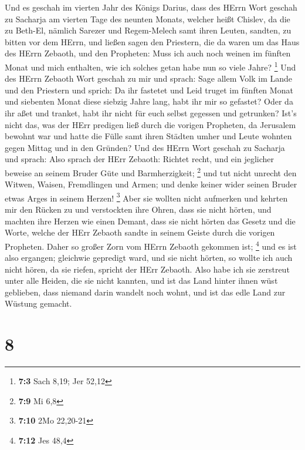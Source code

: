  Und es geschah im vierten Jahr des Königs Darius, dass
des HErrn Wort geschah zu Sacharja am vierten Tage des neunten Monats,
welcher heißt Chislev,  da die zu Beth-El, nämlich Sarezer
und Regem-Melech samt ihren Leuten, sandten, zu bitten vor dem HErrn,
 und ließen sagen den Priestern, die da waren um das Haus
des HErrn Zebaoth, und den Propheten: Muss ich auch noch weinen im
fünften Monat und mich enthalten, wie ich solches getan habe nun so
viele Jahre? \footnote{\textbf{7:3} Sach 8,19; Jer 52,12} 
Und des HErrn Zebaoth Wort geschah zu mir und sprach: 
Sage allem Volk im Lande und den Priestern und sprich: Da ihr fastetet
und Leid truget im fünften Monat und siebenten Monat diese siebzig Jahre
lang, habt ihr mir so gefastet?  Oder da ihr aßet und
tranket, habt ihr nicht für euch selbst gegessen und getrunken?
 Ist's nicht das, was der HErr predigen ließ durch die
vorigen Propheten, da Jerusalem bewohnt war und hatte die Fülle samt
ihren Städten umher und Leute wohnten gegen Mittag und in den Gründen?
 Und des HErrn Wort geschah zu Sacharja und sprach:
 Also sprach der HErr Zebaoth: Richtet recht, und ein
jeglicher beweise an seinem Bruder Güte und Barmherzigkeit; \footnote{\textbf{7:9}
  Mi 6,8}  und tut nicht unrecht den Witwen, Waisen,
Fremdlingen und Armen; und denke keiner wider seinen Bruder etwas Arges
in seinem Herzen! \footnote{\textbf{7:10} 2Mo 22,20-21} 
Aber sie wollten nicht aufmerken und kehrten mir den Rücken zu und
verstockten ihre Ohren, dass sie nicht hörten,  und
machten ihre Herzen wie einen Demant, dass sie nicht hörten das Gesetz
und die Worte, welche der HErr Zebaoth sandte in seinem Geiste durch die
vorigen Propheten. Daher so großer Zorn vom HErrn Zebaoth gekommen ist;
\footnote{\textbf{7:12} Jes 48,4}  und es ist also
ergangen; gleichwie gepredigt ward, und sie nicht hörten, so wollte ich
auch nicht hören, da sie riefen, spricht der HErr Zebaoth.
 Also habe ich sie zerstreut unter alle Heiden, die sie
nicht kannten, und ist das Land hinter ihnen wüst geblieben, dass
niemand darin wandelt noch wohnt, und ist das edle Land zur Wüstung
gemacht.

\hypertarget{section-7}{%
\section{8}\label{section-7}}

